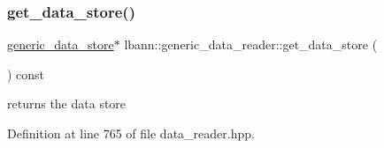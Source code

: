 \subsubsection{\texorpdfstring{get\+\_\+data\+\_\+store()}{get\_data\_store()}}
{\footnotesize\ttfamily \hyperlink{classlbann_1_1generic__data__store}{generic\+\_\+data\+\_\+store}$\ast$ lbann\+::generic\+\_\+data\+\_\+reader\+::get\+\_\+data\+\_\+store (\begin{DoxyParamCaption}{ }\end{DoxyParamCaption}) const\hspace{0.3cm}{\ttfamily [inline]}}



returns the data store 



Definition at line 765 of file data\+\_\+reader.\+hpp.


